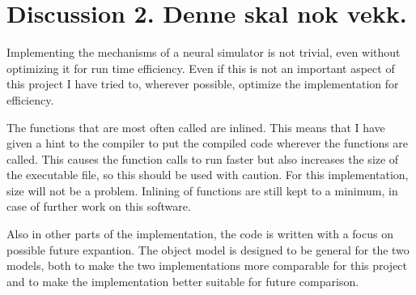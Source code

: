 

\section{Discussion 2. Denne skal nok vekk.}


Implementing the mechanisms of a neural simulator is not trivial, even without optimizing it for run time efficiency.
Even if this is not an important aspect of this project I have tried to, wherever possible, optimize the implementation for efficiency.

The functions that are most often called are inlined. This means that I have given a hint to the compiler to put the compiled code wherever the functions are called.
This causes the function calls to run faster but also increases the size of the executable file, so this should be used with caution. %
For this implementation, size will not be a problem. %
Inlining of functions are still kept to a minimum, in case of further work on this software. %

Also in other parts of the implementation, the code is written with a focus on possible future expantion.
The object model is designed to be general for the two models, both to make the two implementations more comparable for this project and to make the implementation better suitable for future comparison.

